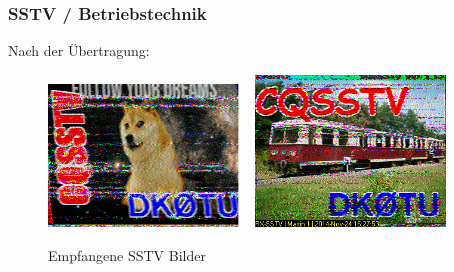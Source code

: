 \begin{frame}
  \frametitle{SSTV / Betriebstechnik}

  Nach der Übertragung:

  \begin{center}
    \begin{figure}
      \includegraphics[width=0.45\textwidth,height=.45\textheight,keepaspectratio]{e16/sstv_cq.png}
      ~
      \includegraphics[width=0.45\textwidth,height=.45\textheight,keepaspectratio]{e16/sstv_cq_201411241627.png}
      \caption{Empfangene SSTV Bilder}
    \end{figure}
  \end{center}

\end{frame}

